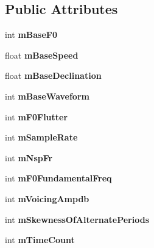 \subsection*{Public Attributes}
\begin{DoxyCompactItemize}
\item 
\mbox{\label{classklatt_a96760468fde0f7cfc0681edf78350c2e}} 
int {\bfseries m\+Base\+F0}
\item 
\mbox{\label{classklatt_aa3fea71e878bf5158f950c3813f3e9d6}} 
float {\bfseries m\+Base\+Speed}
\item 
\mbox{\label{classklatt_aafa3591746e3db0ad320cf5f53cd50dd}} 
float {\bfseries m\+Base\+Declination}
\item 
\mbox{\label{classklatt_ad9532cf46da07a5fce9ff81abf2aec9c}} 
int {\bfseries m\+Base\+Waveform}
\item 
\mbox{\label{classklatt_affb03990ebd5a2a39cb3b068c3d8ae8f}} 
int {\bfseries m\+F0\+Flutter}
\item 
\mbox{\label{classklatt_af9dfa544c95bf08ab92bf3ae81c80c9c}} 
int {\bfseries m\+Sample\+Rate}
\item 
\mbox{\label{classklatt_accfab0d4c0530a7983259e182fb19816}} 
int {\bfseries m\+Nsp\+Fr}
\item 
\mbox{\label{classklatt_a5910bf592cc3e2c937158a9a9fb8d820}} 
int {\bfseries m\+F0\+Fundamental\+Freq}
\item 
\mbox{\label{classklatt_a56a411d6561de6c3c2cf4045eb9ecc01}} 
int {\bfseries m\+Voicing\+Ampdb}
\item 
\mbox{\label{classklatt_ac8c4e1e0658a0349f902a9f4096f7808}} 
int {\bfseries m\+Skewness\+Of\+Alternate\+Periods}
\item 
\mbox{\label{classklatt_af5a1c3717bbdeadd8a1e311349b37dea}} 
int {\bfseries m\+Time\+Count}
\item 
\mbox{\label{classklatt_a64094172569ff5e41e25aa6652f16516}} 

\end{DoxyCompactItemize}
